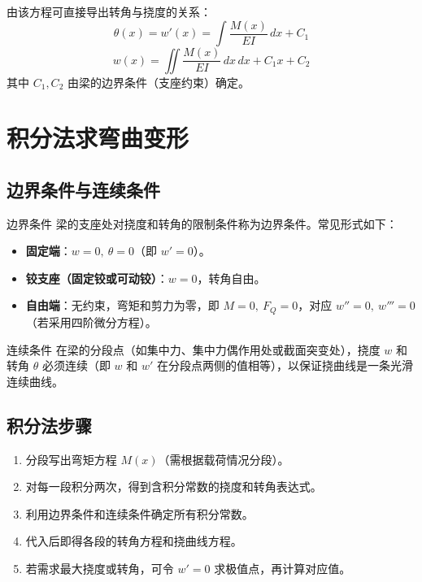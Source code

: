 \begin{myformula}
     \quad {}
\end{myformula}

由该方程可直接导出转角与挠度的关系：
\[
\theta(x) = w'(x) = \int \frac{M(x)}{EI} \, dx + C_1
\]
\[
w(x) = \iint \frac{M(x)}{EI} \, dx \, dx + C_1 x + C_2
\]
其中 \(C_1, C_2\) 由梁的边界条件（支座约束）确定。

\section{积分法求弯曲变形}

\subsection{边界条件与连续条件}

\begin{mydefinition}{边界条件}
    梁的支座处对挠度和转角的限制条件称为边界条件。常见形式如下：
    \begin{itemize}
        \item \textbf{固定端}：\(w=0,\ \theta=0\)（即 \(w'=0\)）。
        \item \textbf{铰支座（固定铰或可动铰）}：\(w=0\)，转角自由。
        \item \textbf{自由端}：无约束，弯矩和剪力为零，即 \(M=0,\ F_Q=0\)，对应 \(w''=0,\ w'''=0\)（若采用四阶微分方程）。
    \end{itemize}
\end{mydefinition}

\begin{mydefinition}{连续条件}
    在梁的分段点（如集中力、集中力偶作用处或截面突变处），挠度 \(w\) 和转角 \(\theta\) 必须连续（即 \(w\) 和 \(w'\) 在分段点两侧的值相等），以保证挠曲线是一条光滑连续曲线。
\end{mydefinition}

\subsection{积分法步骤}
\begin{enumerate}
    \item 分段写出弯矩方程 \(M(x)\)（需根据载荷情况分段）。
    \item 对每一段积分两次，得到含积分常数的挠度和转角表达式。
    \item 利用边界条件和连续条件确定所有积分常数。
    \item 代入后即得各段的转角方程和挠曲线方程。
    \item 若需求最大挠度或转角，可令 \(w'=0\) 求极值点，再计算对应值。
\end{enumerate}

